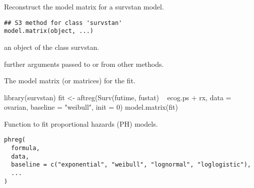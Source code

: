 \documentclass[letterpaper]{book}
\begin{document}
%
\begin{Description}\relax
Reconstruct the model matrix for a survstan model.
\end{Description}
%
\begin{Usage}
\begin{verbatim}
## S3 method for class 'survstan'
model.matrix(object, ...)
\end{verbatim}
\end{Usage}
%
\begin{Arguments}
\begin{ldescription}
\item[\code{object}] an object of the class survstan.

\item[\code{...}] further arguments passed to or from other methods.
\end{ldescription}
\end{Arguments}
%
\begin{Value}
The model matrix (or matrices) for the fit.
\end{Value}
%
\begin{Examples}
\begin{ExampleCode}

library(survstan)
fit <- aftreg(Surv(futime, fustat) ~ ecog.ps + rx, data = ovarian, baseline = "weibull", init = 0)
model.matrix(fit)


\end{ExampleCode}
\end{Examples}
%
\begin{Description}\relax
Function to fit proportional hazards (PH) models.
\end{Description}
%
\begin{Usage}
\begin{verbatim}
phreg(
  formula,
  data,
  baseline = c("exponential", "weibull", "lognormal", "loglogistic"),
  ...
)
\end{verbatim}
\end{Usage}
%
\end{document}
